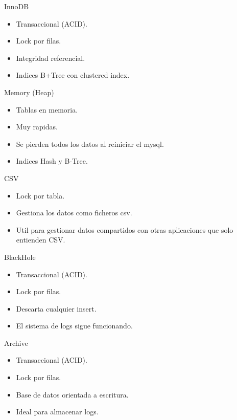 \begin{frame}{InnoDB}
  \begin{itemize}
    \item Transaccional (ACID).
    \item Lock por filas.
    \item Integridad referencial.
    \item Indices B+Tree con clustered index.
  \end{itemize}
\end{frame}

\begin{frame}{Memory (Heap)}
  \begin{itemize}
    \item Tablas en memoria.
    \item Muy rapidas.
    \item Se pierden todos los datos al reiniciar el mysql.
    \item Indices Hash y B-Tree.
  \end{itemize}
\end{frame}

\begin{frame}{CSV}
  \begin{itemize}
    \item Lock por tabla.
    \item Gestiona los datos como ficheros csv.
    \item Util para gestionar datos compartidos con otras aplicaciones que solo entienden CSV.
  \end{itemize}
\end{frame}

\begin{frame}{BlackHole}
  \begin{itemize}
    \item Transaccional (ACID).
    \item Lock por filas.
    \item Descarta cualquier insert.
    \item El sistema de logs sigue funcionando.
  \end{itemize}
\end{frame}

\begin{frame}{Archive}
  \begin{itemize}
    \item Transaccional (ACID).
    \item Lock por filas.
    \item Base de datos orientada a escritura.
    \item Ideal para almacenar logs.
  \end{itemize}
\end{frame}

